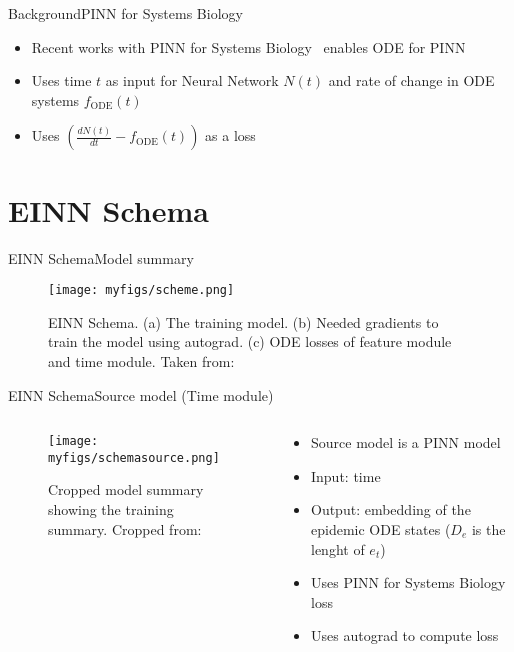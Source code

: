 \documentclass[
	aspectratio=169,	%
	onlytextwidth,		%
	t,					%
	]{beamer}
\begin{document}
\begin{frame}[fragile]{Background}{PINN for Systems Biology}

	\begin{itemize}

		\item Recent works with PINN for Systems Biology~\cite{yazdani, karnia} enables ODE for PINN 
		\item Uses time $t$ as input for Neural Network $N (t)$ and rate of change in ODE systems $f_{\text{ODE}} (t)$
		\item Uses $ (\frac{dN (t)}{dt}-f_{\text{ODE}} (t))$ as a loss
		
	\end{itemize}

\end{frame}

\section{EINN Schema}

\begin{frame}[fragile]{EINN Schema}{Model summary}

	\begin{figure}
		\texttt{[image: myfigs/scheme.png]}
		\caption{EINN Schema. (a) The training model. (b) Needed gradients to train the model using autograd. (c) ODE losses of feature module and time module. Taken from:~\cite{main}}

	\end{figure}

\end{frame}

\begin{frame}[fragile]{EINN Schema}{Source model (Time module)}
	\begin{columns}
		
		\begin{column}[T]{.5\textwidth}
			\begin{figure}
				\texttt{[image: myfigs/schemasource.png]}
				\caption{Cropped model summary showing the training summary. Cropped from:~\cite{main}}
			\end{figure}
		\end{column}
		
		\begin{column}[T]{.5\textwidth}
			\begin{itemize}
				\item<1-> Source model is a PINN model
				\item<2-> Input: time
				\item<3-> Output: embedding of the epidemic ODE states ($D_{e}$ is the lenght of $e_{t}$)
				\item <4-> Uses PINN for Systems Biology loss
				\item<5-> Uses autograd to compute loss
			\end{itemize}
		\end{column}
			
\end{columns}
\end{frame}
\end{document}
